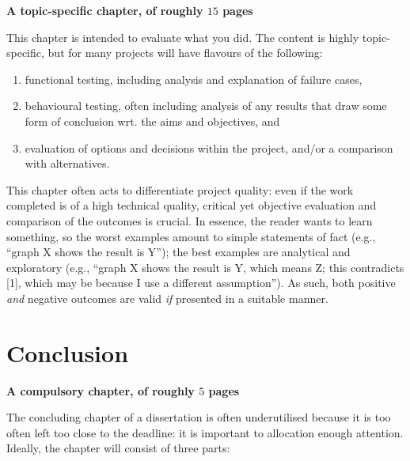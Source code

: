 \documentclass[ %
                    author={Tom Jager},
                supervisor={Dr. Daniel Schien},
                    degree={MEng},
                     title={A Bayesian Inference Engine for UMIS Structured Data},
                  subtitle={},
                      type={research},
                      year={2019} ]{dissertation}
\begin{document}
{\bf A topic-specific chapter, of roughly $15$ pages} 
\vspace{1cm} 

\noindent
This chapter is intended to evaluate what you did.  The content is highly 
topic-specific, but for many projects will have flavours of the following:

\begin{enumerate}
\item functional  testing, including analysis and explanation of failure 
      cases,
\item behavioural testing, often including analysis of any results that 
      draw some form of conclusion wrt. the aims and objectives,
      and
\item evaluation of options and decisions within the project, and/or a
      comparison with alternatives.
\end{enumerate}

\noindent
This chapter often acts to differentiate project quality: even if the work
completed is of a high technical quality, critical yet objective evaluation 
and comparison of the outcomes is crucial.  In essence, the reader wants to
learn something, so the worst examples amount to simple statements of fact 
(e.g., ``graph X shows the result is Y''); the best examples are analytical 
and exploratory (e.g., ``graph X shows the result is Y, which means Z; this 
contradicts [1], which may be because I use a different assumption'').  As 
such, both positive {\em and} negative outcomes are valid {\em if} presented 
in a suitable manner.


\chapter{Conclusion}
\label{chap:conclusion}

{\bf A compulsory chapter,     of roughly $5$ pages} 
\vspace{1cm} 

\noindent
The concluding chapter of a dissertation is often underutilised because it 
is too often left too close to the deadline: it is important to allocation
enough attention.  Ideally, the chapter will consist of three parts:
\end{document}
